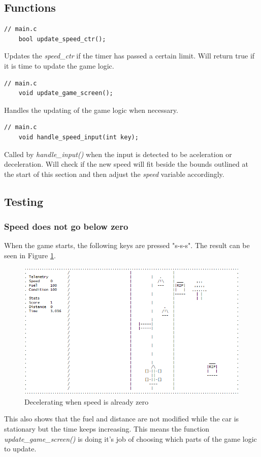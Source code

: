 \documentclass{article}
\begin{document}
\subsection*{Functions}
\begin{lstlisting}[style=CStyle]
	// main.c
	bool update_speed_ctr();
\end{lstlisting}
 Updates the \emph{speed\_ctr} if the timer has passed a certain limit. Will return true if it is time to update the game logic.
\begin{lstlisting}[style=CStyle]
	// main.c
	void update_game_screen();
\end{lstlisting}
Handles the updating of the game logic when necessary. 
\begin{lstlisting}[style=CStyle]
	// main.c
	void handle_speed_input(int key);
\end{lstlisting}
Called by \emph{handle\_input()} when the input is detected to be aceleration or deceleration. Will check if the new speed will fit beside the bounds outlined at the start of this section and then adjust the \emph{speed} variable accordingly. 
\newline

\subsection*{Testing}
\subsubsection*{Speed does not go below zero}
When the game starts, the following keys are pressed "s-s-s". The result can be seen in Figure \ref{fig:speed_testdecel0}.
\begin{figure}[!ht]
	\begin{center}
	\includegraphics[width=0.667\paperwidth]{images/speed_testdecel0}
	\caption{Decelerating when speed is already zero}
	\label{fig:speed_testdecel0} 
	\end{center}
\end{figure}
\newline
This also shows that the fuel and distance are not modified while the car is stationary but the time keeps increasing. This means the function \emph{update\_game\_screen()} is doing it's job of choosing which parts of the game logic to update.
\newpage
\end{document}
